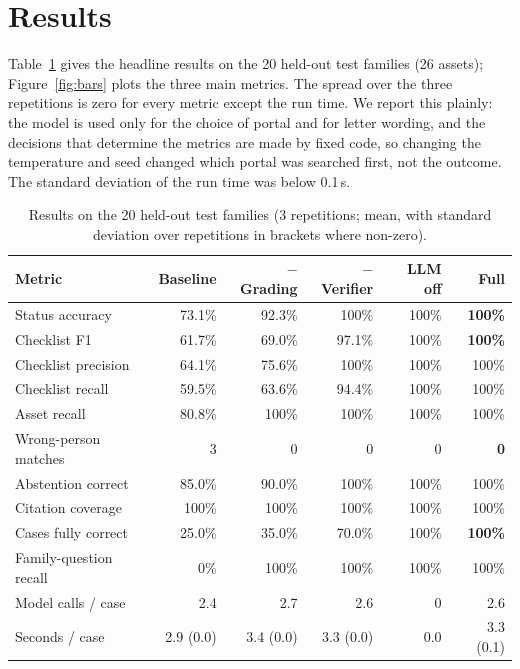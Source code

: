 \section{Results}
Table~\ref{tab:main} gives the headline results on the 20 held-out test families (26 assets); Figure~\ref{fig:bars} plots the three main metrics. The spread over the three repetitions is zero for every metric except the run time. We report this plainly: the model is used only for the choice of portal and for letter wording, and the decisions that determine the metrics are made by fixed code, so changing the temperature and seed changed which portal was searched first, not the outcome. The standard deviation of the run time was below 0.1\,s.

\begin{table}[H]
\centering\footnotesize{}
\caption[Results on the held-out test families]{Results on the 20 held-out test families (3 repetitions; mean, with standard deviation over repetitions in brackets where non-zero).}\label{tab:main}
\renewcommand{\arraystretch}{1.1}
\begin{tabularx}{\linewidth}{@{}p{3.6cm}rrrrr@{}}
\toprule
\textbf{Metric} & \textbf{Baseline} & \textbf{$-$Grading} & \textbf{$-$Verifier} & \textbf{LLM off} & \textbf{Full} \\ \midrule
Status accuracy & 73.1\% & 92.3\% & 100\% & 100\% & \textbf{100\%} \\
Checklist F1 & 61.7\% & 69.0\% & 97.1\% & 100\% & \textbf{100\%} \\
Checklist precision & 64.1\% & 75.6\% & 100\% & 100\% & 100\% \\
Checklist recall & 59.5\% & 63.6\% & 94.4\% & 100\% & 100\% \\
Asset recall & 80.8\% & 100\% & 100\% & 100\% & 100\% \\
Wrong-person matches & 3 & 0 & 0 & 0 & \textbf{0} \\
Abstention correct & 85.0\% & 90.0\% & 100\% & 100\% & 100\% \\
Citation coverage & 100\% & 100\% & 100\% & 100\% & 100\% \\
Cases fully correct & 25.0\% & 35.0\% & 70.0\% & 100\% & \textbf{100\%} \\
Family-question recall & 0\% & 100\% & 100\% & 100\% & 100\% \\
Model calls / case & 2.4 & 2.7 & 2.6 & 0 & 2.6 \\
Seconds / case & 2.9 (0.0) & 3.4 (0.0) & 3.3 (0.0) & 0.0 & 3.3 (0.1) \\ \bottomrule
\end{tabularx}
\end{table}

